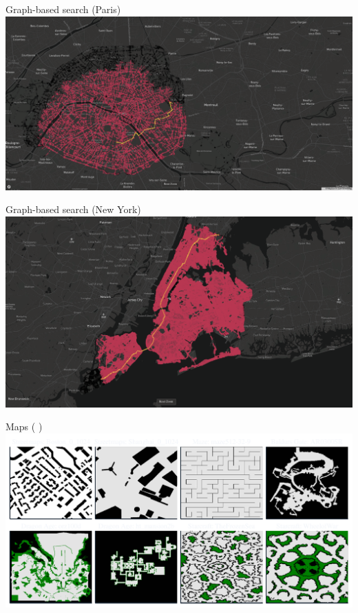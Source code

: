 \documentclass[aspectratio=169]{beamer}
\begin{document}
\begin{frame}[plain]{Graph-based search (Paris)}
    \includegraphics[height=0.9\textheight, keepaspectratio]{figures/paris_graph_based.pdf}
\end{frame}

\begin{frame}[plain]{Graph-based search (New York)}
    \includegraphics[height=0.9\textheight, keepaspectratio]{figures/ny_graph_based.png}
\end{frame}

\begin{frame}{Maps {\Medium \color{white}( \cite{sturtevant2012benchmarks})}}
    \includegraphics[width=1.0\linewidth, keepaspectratio]{figures/show_maps.pdf}
\end{frame}
\end{document}

